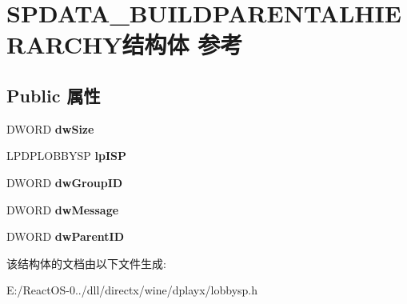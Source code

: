 \hypertarget{struct_s_p_d_a_t_a___b_u_i_l_d_p_a_r_e_n_t_a_l_h_i_e_r_a_r_c_h_y}{}\section{S\+P\+D\+A\+T\+A\+\_\+\+B\+U\+I\+L\+D\+P\+A\+R\+E\+N\+T\+A\+L\+H\+I\+E\+R\+A\+R\+C\+H\+Y结构体 参考}
\label{struct_s_p_d_a_t_a___b_u_i_l_d_p_a_r_e_n_t_a_l_h_i_e_r_a_r_c_h_y}
\subsection*{Public 属性}
\begin{DoxyCompactItemize}
\item 
\mbox{\label{struct_s_p_d_a_t_a___b_u_i_l_d_p_a_r_e_n_t_a_l_h_i_e_r_a_r_c_h_y_af71ff64b7e83648b8cb98dc4ba44d905}} 
D\+W\+O\+RD {\bfseries dw\+Size}
\item 
\mbox{\label{struct_s_p_d_a_t_a___b_u_i_l_d_p_a_r_e_n_t_a_l_h_i_e_r_a_r_c_h_y_ab4ac3425f2308a02f25ed7a9b62c3b00}} 
L\+P\+D\+P\+L\+O\+B\+B\+Y\+SP {\bfseries lp\+I\+SP}
\item 
\mbox{\label{struct_s_p_d_a_t_a___b_u_i_l_d_p_a_r_e_n_t_a_l_h_i_e_r_a_r_c_h_y_a44a35036eb1cdd3d788b477d5f2c38f8}} 
D\+W\+O\+RD {\bfseries dw\+Group\+ID}
\item 
\mbox{\label{struct_s_p_d_a_t_a___b_u_i_l_d_p_a_r_e_n_t_a_l_h_i_e_r_a_r_c_h_y_addb1d19f0856ea3e0e470efbad007bb9}} 
D\+W\+O\+RD {\bfseries dw\+Message}
\item 
\mbox{\label{struct_s_p_d_a_t_a___b_u_i_l_d_p_a_r_e_n_t_a_l_h_i_e_r_a_r_c_h_y_a2939cc1a1d71ce0a9858ca497c0a3e4a}} 
D\+W\+O\+RD {\bfseries dw\+Parent\+ID}
\end{DoxyCompactItemize}


该结构体的文档由以下文件生成\+:\begin{DoxyCompactItemize}
\item 
E\+:/\+React\+O\+S-\/0../dll/directx/wine/dplayx/lobbysp.\+h\end{DoxyCompactItemize}
